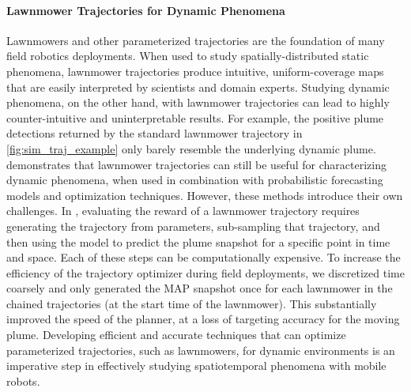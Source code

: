 \paragraph{Lawnmower Trajectories for Dynamic Phenomena}
Lawnmowers and other parameterized trajectories are the foundation of many field robotics deployments. When used to study spatially-distributed static phenomena, lawnmower trajectories produce intuitive, uniform-coverage maps that are easily interpreted by scientists and domain experts. Studying dynamic phenomena, on the other hand, with lawnmower trajectories can lead to highly counter-intuitive and uninterpretable results. For example, the positive plume detections returned by the standard lawnmower trajectory in \cref{fig:sim_traj_example} only barely resemble the underlying dynamic plume. \PHORTEX demonstrates that lawnmower trajectories can still be useful for characterizing dynamic phenomena, when used in combination with probabilistic forecasting models and optimization techniques. However, these methods introduce their own challenges. In \PHORTEX, evaluating the reward of a lawnmower trajectory requires generating the trajectory from parameters, sub-sampling that trajectory, and then using the \PHUMES model to predict the plume snapshot for a specific point in time and space. Each of these steps can be computationally expensive. To increase the efficiency of the trajectory optimizer during field deployments, we discretized time coarsely and only generated the MAP \PHUMES snapshot once for each lawnmower in the chained trajectories (at the start time of the lawnmower). This substantially improved the speed of the planner, at a loss of targeting accuracy for the moving plume. Developing efficient and accurate techniques that can optimize parameterized trajectories, such as lawnmowers, for dynamic environments is an imperative step in effectively studying spatiotemporal phenomena with mobile robots.

